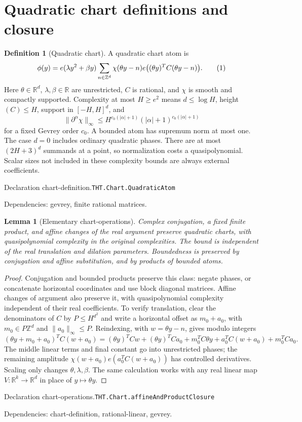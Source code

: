 \documentclass[11pt]{article}
\newtheorem{lemma}[theorem]{Lemma}
\theoremstyle{definition}
\newtheorem{definition}[theorem]{Definition}
\newcommand{\R}{\mathbb R}
\newcommand{\Z}{\mathbb Z}
\newcommand{\eqtag}[1]{\refstepcounter{equation}\tag{\theequation}\label{#1}}
\numberwithin{equation}{section}
\newcommand{\bp}[3]{\par\smallskip\begingroup\footnotesize
\noindent\hypertarget{bp:#1}{\textsf{Declaration #1.}}\quad\nolinkurl{#2}\par
\noindent\textsf{Dependencies:} #3.\par\endgroup\smallskip}
\begin{document}
\section{Quadratic chart definitions and closure}\label{sec:chart-definitions}
\begin{definition}[Quadratic chart]\label{def:chart}
A quadratic chart atom is
\[
 \phi(y)=e(\lambda y^2+\beta y)\sum_{n\in\Z^d}
 \chi(\theta y-n)e\bigl((\theta y)^TC(\theta y-n)\bigr).
 \eqtag{eq:atom}
\]
Here $\theta\in\R^d$, $\lambda,\beta\in\R$ are unrestricted, $C$ is rational, and $\chi$ is smooth and compactly supported. Complexity at most $H\ge e^2$ means $d\le\log H$, height$(C)\le H$, support in $[-H,H]^d$, and
\[
 \|\partial^\alpha\chi\|_\infty
 \le H^{c_0(|\alpha|+1)}(|\alpha|+1)^{c_0(|\alpha|+1)}
\]
for a fixed Gevrey order $c_0$. A bounded atom has supremum norm at most one. The case $d=0$ includes ordinary quadratic phases. There are at most $(2H+3)^d$ summands at a point, so normalization costs a quasipolynomial. Scalar sizes not included in these complexity bounds are always external coefficients.

\end{definition}
\bp{chart-definition}{THT.Chart.QuadraticAtom}{gevrey, finite rational matrices}

\begin{lemma}[Elementary chart-operations]\label{lem:chart-operations}
Complex conjugation, a fixed finite product, and affine changes of the real argument preserve quadratic charts, with quasipolynomial complexity in the original complexities. The bound is independent of the real translation and dilation parameters. Boundedness is preserved by conjugation and affine substitution, and by products of bounded atoms.
\end{lemma}
\begin{proof}
Conjugation and bounded products preserve this class: negate phases, or concatenate horizontal coordinates and use block diagonal matrices. Affine changes of argument also preserve it, with quasipolynomial complexity independent of their real coefficients. To verify translation, clear the denominators of $C$ by $P\le H^{d^2}$ and write a horizontal offset as $m_0+a_0$, with $m_0\in P\Z^d$ and $\|a_0\|_\infty\le P$. Reindexing, with $w=\theta y-n$, gives modulo integers
\[
 (\theta y+m_0+a_0)^TC(w+a_0)
 =(\theta y)^TCw+(\theta y)^TCa_0+m_0^TC\theta y+a_0^TC(w+a_0)+m_0^TCa_0.
\]
The middle linear terms and final constant go into unrestricted phases; the remaining amplitude $\chi(w+a_0)e(a_0^TC(w+a_0))$ has controlled derivatives. Scaling only changes $\theta,\lambda,\beta$. The same calculation works with any real linear map $V:\R^k\to\R^d$ in place of $y\mapsto\theta y$.

\end{proof}
\bp{chart-operations}{THT.Chart.affineAndProductClosure}{chart-definition, rational-linear, gevrey}
\end{document}
